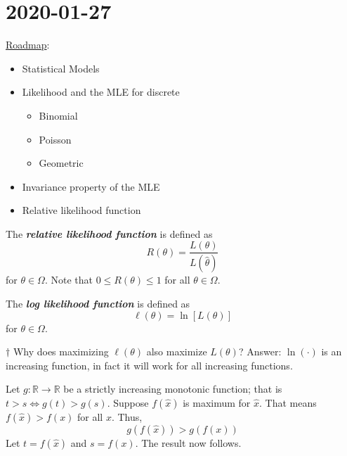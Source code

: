 \section{2020-01-27}
\underline{Roadmap}:
\begin{itemize}
    \item Statistical Models
    \item Likelihood and the MLE for discrete
          \begin{itemize}
              \item Binomial
              \item Poisson
              \item Geometric
          \end{itemize}
    \item Invariance property of the MLE
    \item Relative likelihood function
\end{itemize}
\begin{defbox}
    \begin{definition}
        The \textbf{\emph{relative likelihood function}} is defined as
        \[ R(\theta)=\frac{L(\theta)}{L(\hat{\theta})} \]
        for $ \theta\in\Omega $. Note that $ 0\leqslant R(\theta)\leqslant 1 $
        for all $ \theta\in\Omega $.
    \end{definition}
\end{defbox}
\begin{defbox}
    \begin{definition}
        The \textbf{\emph{log likelihood function}} is defined as
        \[ \ell(\theta)=\ln\left[ L(\theta) \right] \]
        for $ \theta\in\Omega $.
    \end{definition}
\end{defbox}
$ \dagger $ Why does maximizing $ \ell(\theta) $ also maximize $ L(\theta) $?
Answer: $ \ln(\cdot) $ is an increasing function, in fact it will work for all increasing functions.

Let $ g:\mathbb{R}\to\mathbb{R} $ be a strictly increasing monotonic function;
that is $ t>s \iff g(t)>g(s) $. Suppose $ f(\hat{x}) $ is maximum for $ \hat{x} $.
That means $ f(\hat{x})>f(x) $ for all $ x $. Thus,
\[ g(f(\hat{x}))>g(f(x)) \]
Let $ t=f(\hat{x}) $ and $ s=f(x) $. The result now follows.

